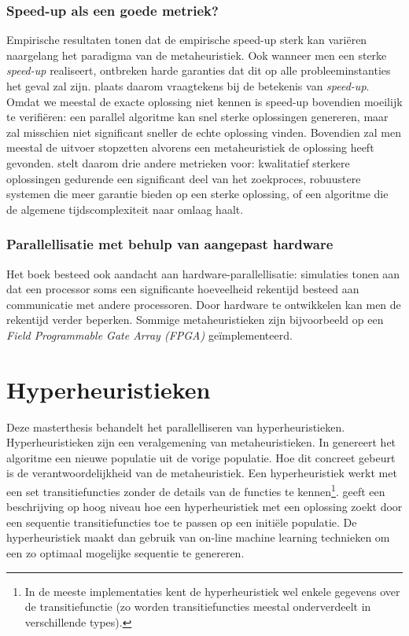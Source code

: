 \subsubsection{Speed-up als een goede metriek?}
Empirische resultaten tonen dat de empirische speed-up sterk kan vari\"eren naargelang het paradigma van de metaheuristiek. Ook wanneer men een sterke \emph{speed-up} realiseert, ontbreken harde garanties dat dit op alle probleeminstanties het geval zal zijn. \cite{crainicAndToulouse} plaats daarom vraagtekens bij de betekenis van \emph{speed-up}. Omdat we meestal de exacte oplossing niet kennen is speed-up bovendien moeilijk te verifi\"eren: een parallel algoritme kan snel sterke oplossingen genereren, maar zal misschien niet significant sneller de echte oplossing vinden. Bovendien zal men meestal de uitvoer stopzetten alvorens een metaheuristiek de oplossing heeft gevonden. \cite{crainicAndToulouse} stelt daarom drie andere metrieken voor: kwalitatief sterkere oplossingen gedurende een significant deel van het zoekproces, robuustere systemen die meer garantie bieden op een sterke oplossing, of een algoritme die de algemene tijdscomplexiteit naar omlaag haalt.

\subsubsection{Parallellisatie met behulp van aangepast hardware}
Het boek besteed ook aandacht aan hardware-parallellisatie: simulaties tonen aan dat een processor soms een significante hoeveelheid rekentijd besteed aan communicatie met andere processoren. Door hardware te ontwikkelen kan men de rekentijd verder beperken. Sommige metaheuristieken zijn bijvoorbeeld op een \emph{Field Programmable Gate Array (FPGA)} ge\"implementeerd\cite{conf/fpt/GuntschMSDESS02,journals/gpem/Martin01}.

\section{Hyperheuristieken}

Deze masterthesis behandelt het parallelliseren van hyperheuristieken. Hyperheuristieken zijn een veralgemening van metaheuristieken. In  genereert het algoritme een nieuwe populatie uit de vorige populatie. Hoe dit concreet gebeurt is de verantwoordelijkheid van de metaheuristiek. Een hyperheuristiek werkt met een set transitiefuncties zonder de details van de functies te kennen\footnote{In de meeste implementaties kent de hyperheuristiek wel enkele gegevens over de transitiefunctie (zo worden transitiefuncties meestal onderverdeelt in verschillende types).}.  geeft een beschrijving op hoog niveau hoe een hyperheuristiek met een oplossing zoekt door een sequentie transitiefuncties toe te passen op een initi\"ele populatie. De hyperheuristiek maakt dan gebruik van on-line machine learning technieken om een zo optimaal mogelijke sequentie te genereren.

